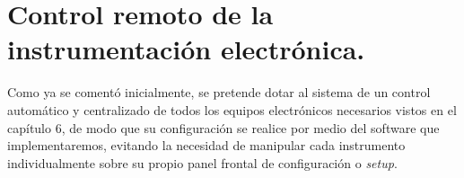 
\chapter{Control remoto de la instrumentación electrónica.}

Como ya se comentó inicialmente, se pretende dotar al sistema de un control automático y centralizado de todos los equipos electrónicos necesarios vistos en el capítulo 6, de modo que su configuración se realice por medio del software que implementaremos, evitando la necesidad de manipular cada instrumento individualmente sobre su propio panel frontal de configuración o \textit{setup}.

%
%
%
%
%
